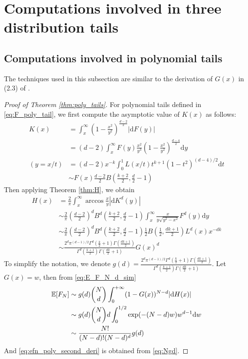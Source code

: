 \documentclass{aptpub}
\def\E{\mathbb{E}}
\def\d{\mathrm{d}}
\begin{document}
\section{Computations involved in three distribution tails}
\subsection{Computations involved in polynomial tails}
The techniques used in this subsection are similar to the derivation of $G(x)$
in (2.3) of \cite{carnal1970konvexe}.

\begin{proof}[Proof of Theorem \ref{thm:poly_tails}]
For polynomial tails defined in \eqref{eq:F_poly_tail},
we first compute the asymptotic value of $K(x)$
as follows:
\begin{align*}
     K(x) & = \int_x^{\infty} (1-\frac{x^2}{y^2})^{\frac{d-2}{2}} |\d F(y)| \\
     &= (d-2)\int_x^{\infty} F(y)\frac{x^2}{y^3} (1-\frac{x^2}{y^2})^{\frac{d-4}{2}} \d y\\
     (y=x/t) &= (d-2)x^{-k} \int_0^{1} L(x/t) t^{k+1} (1-t^2)^{(d-4)/2}\d t \\
     & \sim F(x) \frac{d-2}{2} B\left(\frac{k+2}{2}, \frac{d}{2}-1\right) 
\end{align*}
Then applying Theorem \ref{thm:H}, we obtain
\begin{align*}
     H(x) &= \frac{2}{\pi}
     \int_x^{\infty} \arccos\frac{x}{y}
     |\d K^d(y)| \\
     &\sim \frac{2}{\pi}\left(\frac{d-2}{2}\right)^d
     B^d\left(\frac{k+2}{2}, \frac{d}{2}-1\right)
     \int_x^{\infty} \frac{x}{y \sqrt{y^2-x^2}} F^d(y) \d y \\
     &\sim \frac{2}{\pi}\left(\frac{d-2}{2}\right)^d
     B^d\left(\frac{k+2}{2}, \frac{d}{2}-1\right) \frac{1}{2}
     B\left(\frac{1}{2}, \frac{dk+1}{2}\right)L^d(x) x^{-dk} \\
     &\sim \frac{2^d \pi^{(d-1)/2}\Gamma^d(\frac{k}{2}+1)
     \Gamma(\frac{dk+1}{2})}{
         \Gamma^d(\frac{k+1}{2}) \Gamma(\frac{dk}{2}+1)} G(x)^d 
\end{align*}
To simplify the notation, we denote $g(d)=\frac{2^d \pi^{(d-1)/2}\Gamma^d(\frac{k}{2}+1)
\Gamma(\frac{dk+1}{2})}{
    \Gamma^d(\frac{k+1}{2}) \Gamma(\frac{dk}{2}+1)}$.
Let $G(x)=w$, then from \eqref{eq:E_F_N_d_sim}
\begin{align}
     \E[F_N] &\sim g(d)\binom{N}{d} \int_0^{+\infty} 
      (1-G(x))^{N-d} |\d H(x)| \notag \\
      &\sim g(d)\binom{N}{d}d\int_0^{1/2} \exp(-(N-d)w)w^{d-1}\d w
      \notag \\
      &\sim \frac{N!}{(N-d)! (N-d)^d}g(d) \label{eq:Ngd}
\end{align}
And \eqref{eq:efn_poly_second_deri} is obtained from \eqref{eq:Ngd}.
\end{proof}
\end{document}
